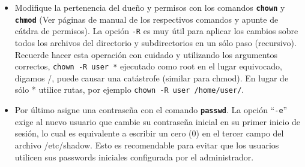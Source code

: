 \documentclass[12pt]{article}
\begin{document}
\begin{itemize}
	\item Modifique la pertenencia del dueño y permisos con los comandos
	\texttt{\textbf{chown}} y \texttt{\textbf{chmod}} (Ver páginas de
	manual de los respectivos comandos y apunte de cátdra de permisos). 
	La opción \texttt{-R} es muy útil para aplicar los cambios sobre todos 
	los archivos del directorio y subdirectorios en un sólo paso (recursivo).
	Recuerde hacer esta operación con cuidado y utilizando los argumentos 
	correctos, \texttt{chown -R user *} ejecutado como root en el lugar equivocado,
	digamos /, puede causar una catástrofe (similar para chmod). En lugar de 
 	sólo * utilice rutas, por ejemplo \texttt{chown -R user /home/user/}. 
 
	\item Por último asigne una contraseña con el comando
	\texttt{\textbf{passwd}}. La opción ``\texttt{-e}'' exige al nuevo usuario 
	que cambie su contraseña inicial en su primer inicio de sesión, lo cual 
	es equivalente a escribir un cero (0) en el tercer campo del archivo 
	/etc/shadow. Esto es recomendable para evitar que los usuarios utilicen 
	sus passwords iniciales configurada por el administrador.  

\end{itemize} 

\end{document}
